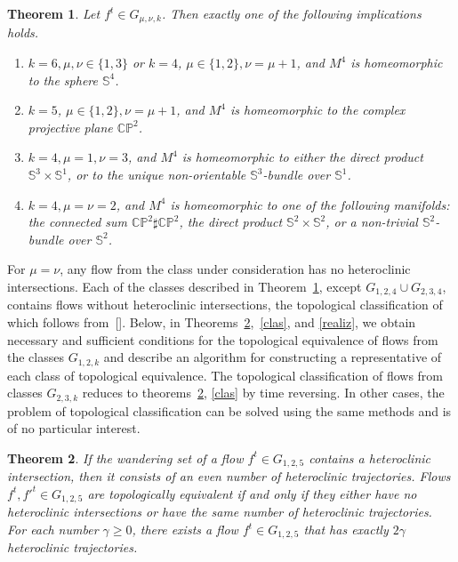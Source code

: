 \documentclass[%
 aip,
 amsmath,amssymb,
preprint,%
]{revtex4-1}
\newtheorem{theorem}{Theorem}
\begin{document}
\begin{theorem} \label{top} Let $f^t\in G_{\mu,\nu,k}$. Then exactly one of the following implications holds.

\begin{enumerate}\itemsep=-2pt
\item $k=6, \mu, \nu\in \{1,3\}$ or $k=4$, $\mu\in \{1,2\}, \nu=\mu+1$, and $M^4$ is homeomorphic to the sphere $\mathbb S^4$.

\item $k=5$, $\mu\in \{1,2\}, \nu=\mu+1$, and $M^4$ is homeomorphic to the complex projective plane $\mathbb{CP}^2$.

\item $k=4, \mu=1, \nu=3$, and $M^4$ is homeomorphic to either the direct product $\mathbb S^3\times \mathbb S^1$, or to the unique non-orientable $\mathbb S^3$-bundle over $\mathbb S^1$.
\item $k=4, \mu=\nu=2$, and $M^4$ is homeomorphic to one of the following manifolds: the connected sum $\mathbb{CP}^2\sharp \mathbb{CP}^2$, the direct product $\mathbb S^2\times \mathbb S^2$, or a non-trivial $\mathbb S^2$-bundle over $\mathbb S^2$.

\end{enumerate}
\end{theorem}

For $\mu=\nu$, any flow from the class under consideration has no heteroclinic intersections. Each of the classes described in Theorem~\ref{top}, except $G_{1,2,4}\cup G_{2,3,4}$, contains flows without heteroclinic intersections, the topological classification of which follows from~[]. Below, in Theorems~\ref{clas+},~\ref{clas}, and \ref{realiz}, we obtain necessary and sufficient conditions for the topological equivalence of flows from the classes $G_{1,2,k}$ and describe an algorithm for constructing a representative of each  class of topological  equivalence. The topological classification of flows from classes $G_{2,3,k}$ reduces to theorems~\ref{clas+}, \ref{clas} by time reversing. In other cases, the problem of topological classification can be solved using the same methods and is of no particular interest.

\begin{theorem}\label{clas+} If the wandering set of a flow $f^t\in G_{1,2,5}$ contains a heteroclinic intersection, then it consists of an even number of heteroclinic trajectories. Flows $f^t, {f'}^t\in G_{1,2,5}$ are topologically equivalent if and only if they either have no heteroclinic intersections or have the same number of heteroclinic trajectories. For each number $\gamma\geq 0$, there exists a flow $f^t\in G_{1,2,5}$ that has exactly $2\gamma$ heteroclinic trajectories.
\end{theorem}
\end{document}
